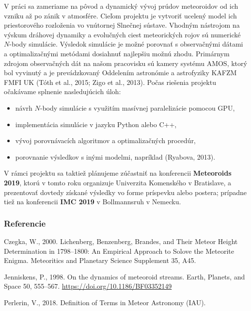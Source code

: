 V práci sa zameriame na pôvod a dynamický vývoj prúdov meteoroidov od
ich vzniku až po zánik v atmosfére. Cieľom projektu je vytvoriť ucelený
model ich priestorového rozloženia vo vnútornej Slnečnej sústave.
Vhodným nástrojom na výskum dráhovej dynamiky a evolučných ciest
meteorických rojov sú numerické \(N\)-body simulácie. Výsledok simulácie
je možné porovnať s observačnými dátami a optimalizačnými metódami
dosiahnuť najlepšiu možnú zhodu. Primárnym zdrojom observačných dát na
našom pracovisku sú kamery systému AMOS, ktorý bol vyvinutý a je
prevádzkovaný Oddelením astronómie a astrofyziky KAFZM FMFI UK (Tóth et
al., 2015; Zigo et al., 2013). Počas riešenia projektu očakávame
splnenie nasledujúcich úloh:

\begin{itemize}
\tightlist
\item
  návrh \(N\)-body simulácie s využitím masívnej paralelizácie pomocou
  GPU,
\item
  implementácia simulácie v jazyku Python alebo C++,
\item
  vývoj porovnávacích algoritmov a optimalizačných procedúr,
\item
  porovnanie výsledkov s inými modelmi, napríklad (Ryabova, 2013).
\end{itemize}

V rámci projektu sa taktiež plánujeme zúčastniť na konferencii
\textbf{Meteoroids 2019}, ktorú v tomto roku organizuje Univerzita
Komenského v Bratislave, a prezentovať dovtedy získané výsledky vo forme
príspevku alebo postera; prípadne tiež na konferencii \textbf{IMC 2019}
v Bollmannsruh v Nemecku.

\subsubsection*{Referencie}\label{referencie}

\hypertarget{refs}{}
\hypertarget{ref-czegka2000}{}
Czegka, W., 2000. Lichenberg, Benzenberg, Brandes, and Their Meteor
Height Determination in 1798--1800: An Empirical Approach to Solove the
Meteorite Enigma. Meteoritics and Planetary Science Supplement 35, A45.

\hypertarget{ref-jenniskens1998}{}
Jenniskens, P., 1998. On the dynamics of meteoroid streams. Earth,
Planets, and Space 50, 555--567.
\url{https://doi.org/10.1186/BF03352149}

\hypertarget{ref-imo-meteor}{}
Perlerin, V., 2018. Definition of Terms in Meteor Astronomy (IAU).


